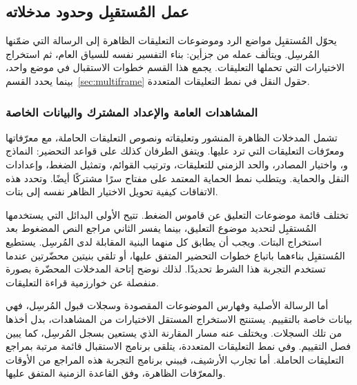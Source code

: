 \subsection{عمل المُستقبِل وحدود مدخلاته}
\label{sec:receiver-operation}

يحوّل المُستقبِل مواضع الرد وموضوعات التعليقات الظاهرة إلى الرسالة التي ضمّنها المُرسِل. ويتألف عمله من جزأين: بناء التفسير نفسه للسياق العام، ثم استخراج الاختيارات التي تحملها التعليقات. يجمع هذا القسم خطوات الاستقبال في موضع واحد، بينما يحدد القسم~\ref{sec:multiframe} حقول النقل في نمط التعليقات المتعددة.

\subsubsection{المشاهدات العامة والإعداد المشترك والبيانات الخاصة}
تشمل المدخلات الظاهرة المنشور وتعليقاته ونصوص التعليقات الحاملة، مع معرّفاتها ومعرّفات التعليقات التي ترد عليها. ويتفق الطرفان كذلك على قواعد التحضير: النماذج و، واختيار المصادر، والحد الزمني للتعليقات، وترتيب القوائم، وتمثيل الضغط، وإعدادات النقل والحماية. ويتطلب نمط الحماية المعتمد على مفتاح سرًا مشتركًا أيضًا. وتحدد هذه الاتفاقات كيفية تحويل الاختيار الظاهر نفسه إلى بتات.

تختلف قائمة موضوعات التعليق عن قاموس الضغط. تتيح الأولى البدائل التي يستخدمها المُستقبِل لتحديد موضوع التعليق، بينما يفسر الثاني مراجع النص المضغوط بعد استخراج البتات. ويجب أن يطابق كل منهما البنية المقابلة لدى المُرسِل. يستطيع المُستقبِل بناءهما باتباع خطوات التحضير المتفق عليها، أو تلقي بنيتين محضّرتين عندما تستخدم التجربة هذا الشرط تحديدًا. لذلك نوضح إتاحة المدخلات المحضّرة بصورة منفصلة عن خوارزمية قراءة التعليقات.

أما الرسالة الأصلية وفهارس الموضوعات المقصودة وسجلات قبول المُرسِل، فهي بيانات خاصة بالتقييم. يستنتج الاستخراج المستقل الاختيارات من المشاهدات، بدل أخذها من تلك السجلات. ويختلف عنه مسار المقارنة الذي يستعين بسجل المُرسِل، كما يبين فصل التقييم. وفي نمط التعليقات المتعددة، يتلقى برنامج الاستقبال قائمة مرتبة بمراجع التعليقات الحاملة. أما تجارب الأرشيف، فيبني برنامج التجربة هذه المراجع من الأوقات والمعرّفات الظاهرة، وفق القاعدة الزمنية المتفق عليها.

